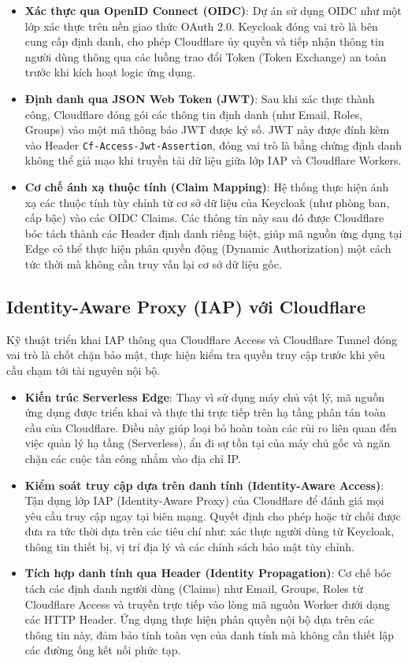 \begin{itemize}
\item \textbf{Xác thực qua OpenID Connect (OIDC)}: Dự án sử dụng OIDC như một lớp xác thực trên nền giao thức OAuth 2.0. Keycloak đóng vai trò là bên cung cấp định danh, cho phép Cloudflare ủy quyền và tiếp nhận thông tin người dùng thông qua các luồng trao đổi Token (Token Exchange) an toàn trước khi kích hoạt logic ứng dụng.

\item \textbf{Định danh qua JSON Web Token (JWT)}: Sau khi xác thực thành công, Cloudflare đóng gói các thông tin định danh (như Email, Roles, Groups) vào một mã thông báo JWT được ký số. JWT này được đính kèm vào Header \texttt{Cf-Access-Jwt-Assertion}, đóng vai trò là bằng chứng định danh không thể giả mạo khi truyền tải dữ liệu giữa lớp IAP và Cloudflare Workers.

\item \textbf{Cơ chế ánh xạ thuộc tính (Claim Mapping)}: Hệ thống thực hiện ánh xạ các thuộc tính tùy chỉnh từ cơ sở dữ liệu của Keycloak (như phòng ban, cấp bậc) vào các OIDC Claims. Các thông tin này sau đó được Cloudflare bóc tách thành các Header định danh riêng biệt, giúp mã nguồn ứng dụng tại Edge có thể thực hiện phân quyền động (Dynamic Authorization) một cách tức thời mà không cần truy vấn lại cơ sở dữ liệu gốc.
\end{itemize}

\subsection{Identity-Aware Proxy (IAP) với Cloudflare}
Kỹ thuật triển khai IAP thông qua Cloudflare Access và Cloudflare Tunnel đóng vai trò là chốt chặn bảo mật, thực hiện kiểm tra quyền truy cập trước khi yêu cầu chạm tới tài nguyên nội bộ.
\begin{itemize}
    \item \textbf{Kiến trúc Serverless Edge}: Thay vì sử dụng máy chủ vật lý, mã nguồn ứng dụng được triển khai và thực thi trực tiếp trên hạ tầng phân tán toàn cầu của Cloudflare. Điều này giúp loại bỏ hoàn toàn các rủi ro liên quan đến việc quản lý hạ tầng (Serverless), ẩn đi sự tồn tại của máy chủ gốc và ngăn chặn các cuộc tấn công nhắm vào địa chỉ IP.

    \item \textbf{Kiểm soát truy cập dựa trên danh tính (Identity-Aware Access)}: Tận dụng lớp IAP (Identity-Aware Proxy) của Cloudflare để đánh giá mọi yêu cầu truy cập ngay tại biên mạng. Quyết định cho phép hoặc từ chối được đưa ra tức thời dựa trên các tiêu chí như: xác thực người dùng từ Keycloak, thông tin thiết bị, vị trí địa lý và các chính sách bảo mật tùy chỉnh.

    \item \textbf{Tích hợp danh tính qua Header (Identity Propagation)}: Cơ chế bóc tách các định danh người dùng (Claims) như Email, Groups, Roles từ Cloudflare Access và truyền trực tiếp vào lòng mã nguồn Worker dưới dạng các HTTP Header. Ứng dụng thực hiện phân quyền nội bộ dựa trên các thông tin này, đảm bảo tính toàn vẹn của danh tính mà không cần thiết lập các đường ống kết nối phức tạp.
\end{itemize}